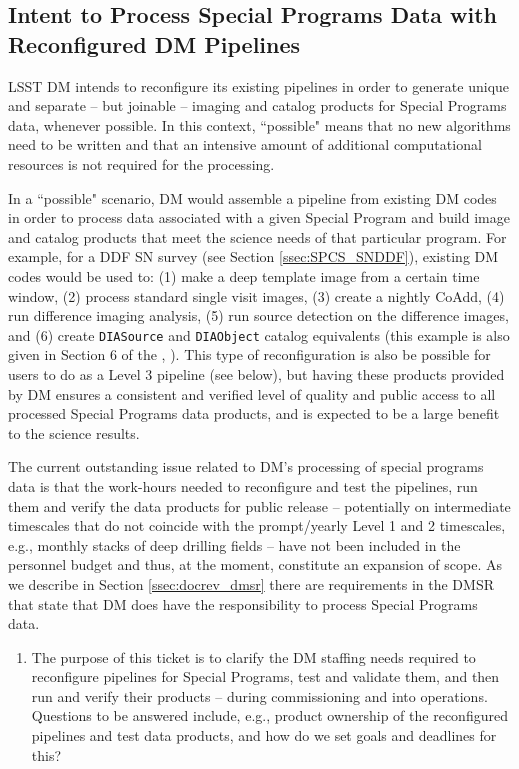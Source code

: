 \documentclass[DM,lsstdraft,toc]{lsstdoc}
\begin{document}
\subsection{Intent to Process Special Programs Data with Reconfigured DM Pipelines}\label{ssec:dmplans_reconfig}

LSST DM intends to reconfigure its existing pipelines in order to generate unique and separate -- but joinable -- imaging and catalog products for Special Programs data, whenever possible. In this context, ``possible" means that no new algorithms need to be written and that an intensive amount of additional computational resources is not required for the processing.

In a ``possible" scenario, DM would assemble a pipeline from existing DM codes in order to process data associated with a given Special Program and build image and catalog products that meet the science needs of that particular program. For example, for a DDF SN survey (see Section \ref{ssec:SPCS_SNDDF}), existing DM codes would be used to: (1) make a deep template image from a certain time window, (2) process standard single visit images, (3) create a nightly CoAdd, (4) run difference imaging analysis, (5) run source detection on the difference images, and (6) create \texttt{DIASource} and \texttt{DIAObject} catalog equivalents (this example is also given in Section 6 of the \DPDD, ). This type of reconfiguration is also be possible for users to do as a Level 3 pipeline (see below), but having these products provided by DM ensures a consistent and verified level of quality and public access to all processed Special Programs data products, and is expected to be a large benefit to the science results.

The current outstanding issue related to DM's processing of special programs data is that the work-hours needed to reconfigure and test the pipelines, run them and verify the data products for public release -- potentially on intermediate timescales that do not coincide with the prompt/yearly Level 1 and 2 timescales, e.g., monthly stacks of deep drilling fields -- have not been included in the personnel budget and thus, at the moment, constitute an expansion of scope. As we describe in Section \ref{ssec:docrev_dmsr} there are requirements in the DMSR that state that DM does have the responsibility to process Special Programs data.

\begin{enumerate}[resume,topsep=-10pt,after=\vspace{10pt},label= \textbf{Action \Roman*}] \item \label{reconfig-1} The purpose of this ticket is to clarify the DM staffing needs required to reconfigure pipelines for Special Programs, test and validate them, and then run and verify their products -- during commissioning and into operations. Questions to be answered include, e.g., product ownership of the reconfigured pipelines and test data products, and how do we set goals and deadlines for this? \end{enumerate}
\end{document}
